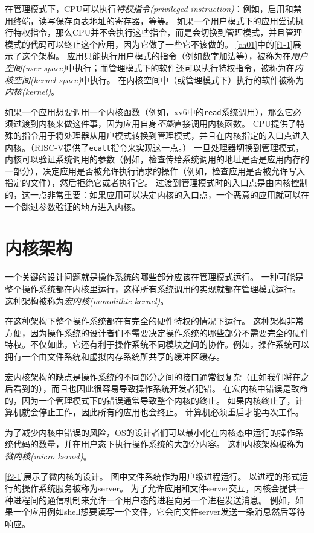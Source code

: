 在管理模式下，CPU可以执行\emph{特权指令(privileged instruction)}：例如，启用和禁用终端，读写保存页表地址的寄存器，等等。
如果一个用户模式下的应用尝试执行特权指令，那么CPU并不会执行这些指令，而是会切换到管理模式，并且管理模式的代码可以终止这个应用，因为它做了一些它不该做的。
\autoref{ch01}中的\autoref{f1-1}展示了这个架构。
应用只能执行用户模式的指令（例如数字加法等），被称为在\emph{用户空间(user space)}中执行；而管理模式下的软件还可以执行特权指令，被称为在\emph{内核空间(kernel space)}中执行。
在内核空间中（或管理模式下）执行的软件被称为\emph{内核(kernel)}。

如果一个应用想要调用一个内核函数（例如，xv6中的\texttt{read}系统调用），那么它必须过渡到内核来做这件事，因为应用自身\emph{不能}直接调用内核函数。
CPU提供了特殊的指令用于将处理器从用户模式转换到管理模式，并且在内核指定的入口点进入内核。（RISC-V提供了\texttt{ecall}指令来实现这一点。）
一旦处理器切换到管理模式，内核可以验证系统调用的参数（例如，检查传给系统调用的地址是否是应用内存的一部分），决定应用是否被允许执行请求的操作（例如，检查应用是否被允许写入指定的文件），然后拒绝它或者执行它。
过渡到管理模式时的入口点是由内核控制的，这一点非常重要：如果应用可以决定内核的入口点，一个恶意的应用就可以在一个跳过参数验证的地方进入内核。

\section{内核架构}
一个关键的设计问题就是操作系统的哪些部分应该在管理模式运行。
一种可能是整个操作系统都在内核里运行，这样所有系统调用的实现就都在管理模式运行。
这种架构被称为\emph{宏内核(monolithic kernel)}。

在这种架构下整个操作系统都在有完全的硬件特权的情况下运行。
这种架构非常方便，因为操作系统的设计者们不需要决定操作系统的哪些部分不需要完全的硬件特权。不仅如此，它还有利于操作系统不同模块之间的协作。例如，操作系统可以拥有一个由文件系统和虚拟内存系统所共享的缓冲区缓存。

宏内核架构的缺点是操作系统的不同部分之间的接口通常很复杂（正如我们将在之后看到的），而且也因此很容易导致操作系统开发者犯错。
在宏内核中错误是致命的，因为一个管理模式下的错误通常导致整个内核的终止。
如果内核终止了，计算机就会停止工作，因此所有的应用也会终止。
计算机必须重启才能再次工作。

为了减少内核中错误的风险，OS的设计者们可以最小化在内核态中运行的操作系统代码的数量，并在用户态下执行操作系统的大部分内容。
这种内核架构被称为\emph{微内核(micro kernel)}。

\autoref{f2-1}展示了微内核的设计。
图中文件系统作为用户级进程运行。
以进程的形式运行的操作系统服务被称为server。
为了允许应用和文件server交互，内核会提供一种进程间的通信机制来允许一个用户态的进程向另一个进程发送消息。
例如，如果一个应用例如shell想要读写一个文件，它会向文件server发送一条消息然后等待响应。

